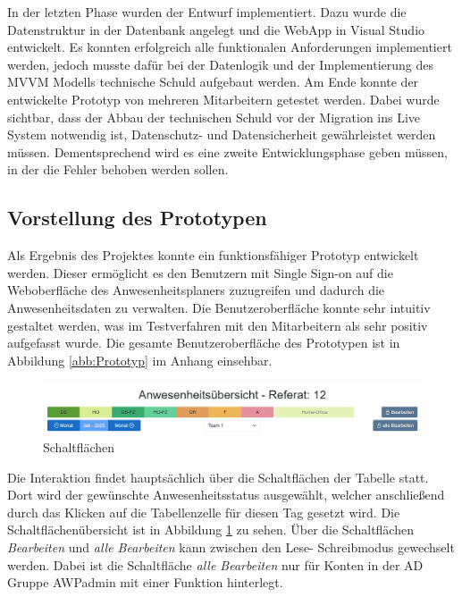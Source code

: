 In der letzten Phase wurden der Entwurf implementiert. Dazu wurde die Datenstruktur in der Datenbank angelegt und die WebApp in Visual Studio entwickelt. Es konnten erfolgreich alle funktionalen Anforderungen implementiert werden, jedoch musste dafür bei der Datenlogik und der Implementierung des MVVM Modells technische Schuld aufgebaut werden. Am Ende konnte der entwickelte Prototyp von mehreren Mitarbeitern getestet werden. Dabei wurde sichtbar, dass der Abbau der technischen Schuld vor der Migration ins Live System notwendig ist, Datenschutz- und Datensicherheit gewährleistet werden müssen. Dementsprechend wird es eine zweite Entwicklungsphase geben müssen, in der die Fehler behoben werden sollen.

\subsection{Vorstellung des Prototypen}
\label{sec:Prototyp}
Als Ergebnis des Projektes konnte ein funktionsfähiger Prototyp entwickelt werden. Dieser ermöglicht es den Benutzern mit Single Sign-on auf die Weboberfläche des Anwesenheitsplaners zuzugreifen und dadurch die Anwesenheitsdaten zu verwalten. Die Benutzeroberfläche konnte sehr intuitiv gestaltet werden, was im Testverfahren mit den Mitarbeitern als sehr positiv aufgefasst wurde. Die gesamte Benutzeroberfläche des Prototypen ist in Abbildung \ref{abb:Prototyp} im Anhang einsehbar.

\begin{figure}[htb]
    \centering
    \includegraphics[width=1\textwidth,angle=0]{abb/Buttons_GUI.png}
    \caption[Schaltflächen]{Schaltflächen}
    \label{abb:Buttons_GUI}
\end{figure}

Die Interaktion findet hauptsächlich über die Schaltflächen der Tabelle statt. Dort wird der gewünschte Anwesenheitsstatus ausgewählt, welcher anschließend durch das Klicken auf die Tabellenzelle für diesen Tag gesetzt wird. Die Schaltflächenübersicht ist in Abbildung \ref{abb:Buttons_GUI} zu sehen. Über die Schaltflächen \textit{Bearbeiten} und \textit{alle Bearbeiten} kann zwischen den Lese- \bzw Schreibmodus gewechselt werden. Dabei ist die Schaltfläche \textit{alle Bearbeiten} nur für Konten in der AD Gruppe AWPadmin mit einer Funktion hinterlegt.

